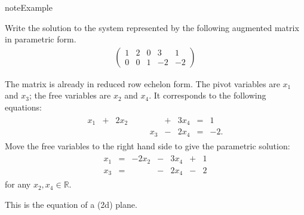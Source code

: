 \documentclass[letterpaper,10pt,english]{jupyterBook}
\begin{document}
\begin{sphinxadmonition}{note}{Example}

\sphinxAtStartPar
Write the solution to the system represented by the following augmented matrix in parametric form.
\begin{equation*}
\begin{split}\left(\begin{array}{cccc|c}
\boxed{1} & 2 & 0 & 3 & 1\\
0 & 0 & \boxed{1} & -2 & -2
\end{array}\right)\end{split}
\end{equation*}
\sphinxAtStartPar
{}

\sphinxAtStartPar
The matrix is already in reduced row echelon form. The pivot variables are \(x_1\) and \(x_3\); the free variables are \(x_2\) and \(x_4\). It corresponds to the following equations:
\begin{equation*}
\begin{split}\begin{alignat*}{4}
x_1 & {}+{} & 2x_2 & \quad &      & {}+{} & 3x_4 & {}={} & 1\\
    &       &      & \quad & x_3 & {}-{} & 2x_4 & {}={} & -2.
\end{alignat*}
\end{split}
\end{equation*}
\sphinxAtStartPar
Move the free variables to the right hand side to give the parametric solution:
\begin{equation*}
\begin{split}\begin{alignat*}{5}
x_1 & {}={} & -2x_2 & {}-{} & 3x_4 & {}+{} & 1\\
x_3 & {}={} &       & {}-{} & 2x_4 & {}-{} & 2
\end{alignat*}
\end{split}
\end{equation*}
\sphinxAtStartPar
for any \(x_2, x_4 \in \mathbb{R}\).

\sphinxAtStartPar
This is the equation of a (2d) plane.
\end{sphinxadmonition}
 \label{exercise:q_parametric_form}
\end{document}
